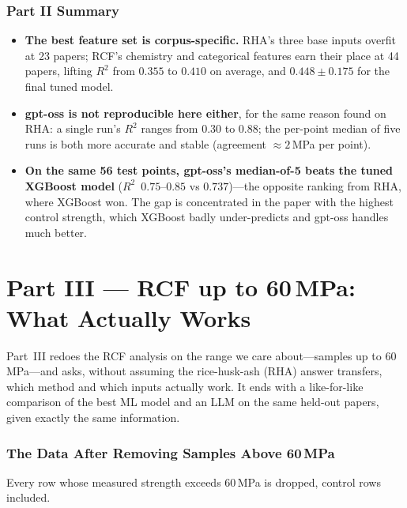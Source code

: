 \documentclass[11pt]{article}
\newcommand{\R}{$R^2$}
\begin{document}
\section{Part II Summary}
\label{sec:p2-summary}
\begin{itemize}\itemsep3pt
  \item \textbf{The best feature set is corpus-specific.} RHA's three base inputs
        overfit at 23 papers; RCF's chemistry and categorical features earn their place
        at 44 papers, lifting \R{} from $0.355$ to $0.410$ on average, and $0.448\pm0.175$
        for the final tuned model.
  \item \textbf{gpt-oss is not reproducible here either}, for the same reason found on
        RHA: a single run's \R{} ranges from $0.30$ to $0.88$; the per-point median of
        five runs is both more accurate and stable (agreement $\approx2$\,MPa per point).
  \item \textbf{On the same 56 test points, gpt-oss's median-of-5 beats the tuned
        XGBoost model} (\R{}~$0.75$--$0.85$ vs $0.737$)---the opposite ranking from RHA,
        where XGBoost won. The gap is concentrated in the paper with the highest control
        strength, which XGBoost badly under-predicts and gpt-oss handles much better.
\end{itemize}

\part*{Part III --- RCF up to 60\,MPa: What Actually Works}
\label{sec:rcf-p3}

Part~III redoes the RCF analysis on the range we care about---samples up to
60\,MPa---and asks, without assuming the rice-husk-ash (RHA) answer transfers, which
method and which inputs actually work. It ends with a like-for-like comparison of the
best ML model and an LLM on the same held-out papers, given exactly the same
information.

\section{The Data After Removing Samples Above 60\,MPa}
\label{sec:rcf-p3-data}
Every row whose measured strength exceeds 60\,MPa is dropped, control rows included.
\end{document}
